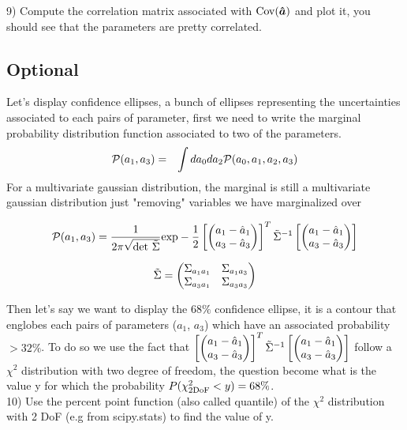 \documentclass[a4paper]{article}
\def\ba{\begin{eqnarray}}
\def\ea{\end{eqnarray}}
\begin{document}
9) Compute the correlation matrix associated with ${\rm Cov}(\bm{\hat{a}}) $ and plot it, you should see that the parameters are pretty correlated.

\subsection*{Optional}
Let's display confidence ellipses, a bunch of ellipses representing the uncertainties associated to each pairs of parameter, first we need to write the marginal probability distribution function associated to two of the parameters.
\ba
{\cal P}(a_{1}, a_{3}) &=& \int da_{0} da_{2}  {\cal P} (a_{0}, a_{1},  a_{2}, a_{3}) \\
\ea
For a multivariate gaussian distribution,  the marginal is still  a multivariate gaussian distribution just "removing" variables we have marginalized over 

\ba
{\cal P}(a_{1}, a_{3}) = \frac{1}{2\pi \sqrt{\rm  det \ \tilde{\Sigma}} } {\rm exp}  - \frac{1}{2} \left[  \begin{pmatrix} 
a_{1} - \hat{a}_{1} \cr
a_{3} - \hat{a}_{3} \cr
\end{pmatrix}
 \right]^{T} \tilde{\Sigma}^{-1}  \left[  \begin{pmatrix} 
a_{1} - \hat{a}_{1} \cr
a_{3} - \hat{a}_{3} \cr
\end{pmatrix} \right]   
\ea

\ba
\tilde{\Sigma}= 
 \begin{pmatrix} 
\Sigma_{a_{1}a_{1}} &
\Sigma_{a_{1}a_{3}} 
\cr
\Sigma_{a_{3}a_{1}}  &
\Sigma_{a_{3}a_{3}} 
\cr
\end{pmatrix}
\ea

Then let's say we want to display the 68$\%$ confidence ellipse, it is a contour that englobes each pairs of parameters ($a_{1}$, $a_{3}$)  which have an associated probability $>32 \%$.
To do so we use the fact that   $ \left[  \begin{pmatrix} 
a_{1} - \hat{a}_{1} \cr
a_{3} - \hat{a}_{3} \cr
\end{pmatrix}
 \right]^{T} \tilde{\Sigma}^{-1}  \left[  \begin{pmatrix} 
a_{1} - \hat{a}_{1} \cr
a_{3} - \hat{a}_{3} \cr
\end{pmatrix} \right]    $ follow a $\chi^{2}$ distribution with two degree of freedom, the question become what is the value y for which the probability $P(\chi^{2}_{2\rm DoF}<y) = 68\%$. \\

10)  Use the percent point function (also called quantile) of the $\chi^{2}$ distribution with 2 DoF (e.g from scipy.stats) to find the value of y. \\
\end{document}
